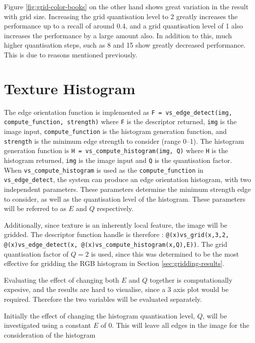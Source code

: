 Figure \ref{fig:grid-color-books} on the other hand shows great variation in the result with grid size. Increasing the grid quantisation level to 2 greatly increases the performance up to a recall of around 0.4, and a grid quantisation level of 1 also increases the performance by a large amount also. In addition to this, much higher quantisation steps, such as 8 and 15 show greatly decreased performance. This is due to reasons mentioned previously.


\FloatBarrier
\section{Texture Histogram} \label{sec:texture-histogram-results}
The edge orientation function is implemented as \texttt{F = vs\_edge\_detect(img, compute\_function, strength)} where \texttt{F} is the descriptor returned, \texttt{img} is the image input, \texttt{compute\_function} is the histogram generation function, and \texttt{strength} is the minimum edge strength to consider (range 0--1). The histogram generation function is \texttt{H = vs\_compute\_histogram(img, Q)} where \texttt{H} is the histogram returned, \texttt{img} is the image input and \texttt{Q} is the quantisation factor. When \texttt{vs\_compute\_histogram} is used as the \texttt{compute\_function} in \texttt{vs\_edge\_detect}, the system can produce an edge orientation histogram, with two independent parameters. These parameters determine the minimum strength edge to consider, as well as the quantisation level of the histogram. These parameters will be referred to as $E$ and $Q$ respectively.

Additionally, since texture is an inherently local feature, the image will be gridded. The descriptor function handle is therefore : \texttt{@(x)vs\_grid(x,3,2, @(x)vs\_edge\_detect(x, @(x)vs\_compute\_histogram(x,Q),E))}. The grid quantisation factor of $Q=2$ is used, since this was determined to be the most effective for gridding the RGB histogram in Section \ref{sec:gridding-results}.

Evaluating the effect of changing both $E$ and $Q$ together is computationally expesive, and the results are hard to visualise, since a 3 axis plot would be required. Therefore the two variables will be evaluated separately.

Initially the effect of changing the histogram quantisation level, $Q$, will be investigated using a constant $E$ of 0. This will leave all edges in the image for the consideration of the histogram

